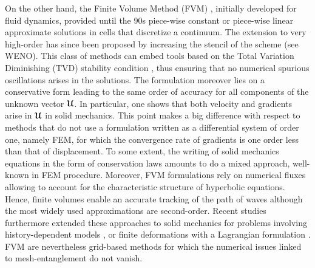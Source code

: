 On the other hand, the Finite Volume Method (FVM) \cite{Leveque}, initially developed for fluid dynamics, provided until the 90s piece-wise constant or piece-wise linear approximate solutions in cells that discretize a continuum.
The extension to very high-order has since been proposed by increasing the stencil of the scheme (see WENO).
This class of methods can embed tools based on the Total Variation Diminishing (TVD) stability condition \cite{Harten}, thus ensuring that no numerical spurious oscillations arises in the solutions. 
The formulation moreover lies on a conservative form leading to the same order of accuracy for all components of the unknown vector ${\boldsymbol{\mathcal{U}}}$.
In particular, one shows that both velocity and gradients arise in ${\boldsymbol{\mathcal{U}}}$ in solid mechanics.
This point makes a big difference with respect to methods that do not use a formulation written as a differential system of order one, namely FEM, for which the convergence rate of gradients is one order less than that of displacement.
To some extent, the writing of solid mechanics equations in the form of conservation laws amounts to do a mixed approach, well-known in FEM procedure.
Moreover, FVM formulations rely on numerical fluxes allowing to account for the characteristic structure of hyperbolic equations.
Hence, finite volumes enable an accurate tracking of the path of waves although the most widely used approximations are second-order. %
Recent studies furthermore extended these approaches to solid mechanics for problems involving history-dependent models \cite{Gavrilyuk,Thomas_EP}, or finite deformations with a Lagrangian formulation \cite{Lee_FVM,Haider_FVM}.
FVM are nevertheless grid-based methods for which the numerical issues linked to mesh-entanglement do not vanish. %

